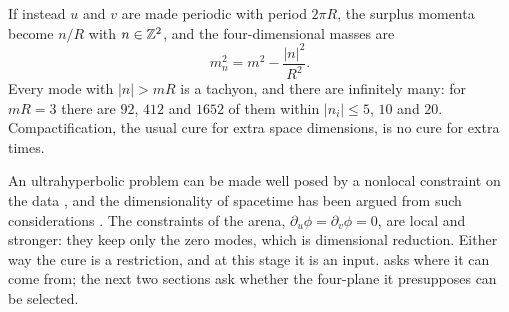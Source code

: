 \begin{example}
\label{ex:tachyons}
If instead $u$ and $v$ are made periodic with period $2\pi R$, the surplus momenta become $n/R$ with $n\in\mathbb{Z}^2$, and the four-dimensional masses are
\[
m_n^2=m^2-\frac{|n|^2}{R^2}.
\]
Every mode with $|n|>mR$ is a tachyon, and there are infinitely many: for $mR=3$ there are $92$, $412$ and $1652$ of them within $|n_i|\le5$, $10$ and $20$.
Compactification, the usual cure for extra space dimensions, is no cure for extra times.
\end{example}

An ultrahyperbolic problem can be made well posed by a nonlocal constraint on the data \cite{CraigWeinstein09}, and the dimensionality of spacetime has been
argued from such considerations \cite{Tegmark97}. The constraints of the arena, $\partial_u\phi=\partial_v\phi=0$, are local and stronger: they keep only the zero modes,
which is dimensional reduction. Either way the cure is a restriction, and at this stage it is an input.  asks where it can come from; the next
two sections ask whether the four-plane it presupposes can be selected.
